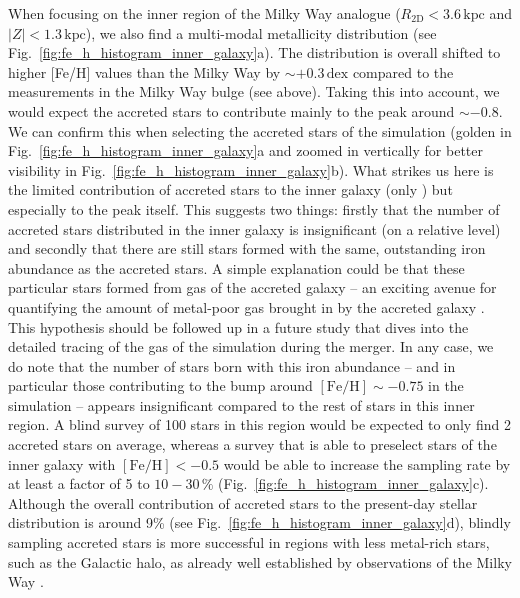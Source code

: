 \documentclass[fleqn,usenatbib]{mnras}
\newcommand{\changed}[1]{{{#1}}}
\begin{document}
When focusing on the inner region of the Milky Way analogue ($R_\mathrm{2D} < 3.6\,\mathrm{kpc}$ and $\vert Z\vert < 1.3\,\mathrm{kpc}$), we also find a multi-modal metallicity distribution (see Fig.~\ref{fig:fe_h_histogram_inner_galaxy}a). The distribution is overall shifted to higher [Fe/H] values than the Milky Way by $\sim+0.3\,\mathrm{dex}$ compared to the measurements in the Milky Way bulge (see above). Taking this into account, we would expect the accreted stars to contribute mainly to the peak around $\sim-0.8$. We can confirm this when selecting the accreted stars of the simulation (golden in Fig.~\ref{fig:fe_h_histogram_inner_galaxy}a and zoomed in vertically for better visibility in Fig.~\ref{fig:fe_h_histogram_inner_galaxy}b). What strikes us here is the limited contribution of accreted stars to the inner galaxy (only ) but especially to the peak itself. This suggests two things: firstly that the \changed{number} of accreted stars distributed in the inner galaxy is insignificant (on a relative level) and secondly that there are still stars formed with the same, outstanding iron abundance as the accreted stars. A simple explanation could be that these particular stars formed from gas of the accreted galaxy -- an exciting avenue for quantifying the amount of metal-poor gas brought in by the accreted galaxy \citep{Buck2023}. This hypothesis should be followed up in a future study that dives into the detailed tracing of the gas of the simulation during the merger. In any case, we do note that the number of stars born with this iron abundance -- and in particular those contributing to the bump around $\mathrm{[Fe/H] \sim -0.75}$ in the simulation -- appears insignificant compared to the rest of stars in this inner region. A blind survey of 100 stars in this region would be expected to only find 2 accreted stars on average, whereas a survey that is able to preselect stars of the inner galaxy with $\mathrm{[Fe/H]} < -0.5$ would be able to increase the sampling rate by at least a factor of 5 to $10-30\,\%$ (Fig.~\ref{fig:fe_h_histogram_inner_galaxy}c). Although the overall contribution of accreted stars to the present-day stellar distribution is around 9\% (see Fig.~\ref{fig:fe_h_histogram_inner_galaxy}d), blindly sampling accreted stars is more successful in regions with less metal-rich stars, such as the Galactic halo, as already well established by observations of the Milky Way \citep[e.g.][]{Conroy2019}.
\end{document}
